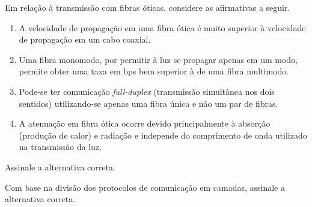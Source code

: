 \documentclass[10pt,a4paper]{article}
\begin{document}
%
{
\def\AMCbeginQuestion#1#2{\par\noindent{\bf (POSCOMP 2011 - Questão 64)}}
\begin{question}{} Em relação à transmissão com fibras óticas, considere as afirmativas a seguir.
\begin{enumerate}[label=\Roman*.]
\item A velocidade de propagação em uma fibra ótica é muito superior à velocidade de propagação em um cabo coaxial.
\item Uma fibra monomodo, por permitir à luz se propagar apenas em um modo, permite obter uma taxa em bps bem superior à de uma fibra multimodo.
\item Pode-se ter comunicação \textit{full-duplex} (transmissão simultânea nos dois sentidos) utilizando-se apenas uma fibra única e não um par de fibras.
\item A atenuação em fibra ótica ocorre devido principalmente à absorção (produção de calor) e radiação e independe do comprimento de onda utilizado na transmissão da luz.
\end{enumerate}
Assinale a alternativa correta.
\begin{choices}
\end{choices}
\end{question}
}
%
{
\def\AMCbeginQuestion#1#2{\par\noindent{\bf (POSCOMP 2011 - Questão 65)}}
\begin{question}{} Com base na divisão dos protocolos de comunicação em camadas, assinale a alternativa correta.
\begin{choices}
\end{choices}
\end{question}
}
\end{document}
